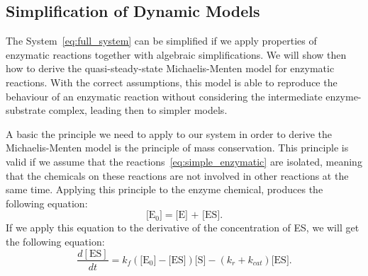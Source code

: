 \subsection{Simplification of Dynamic Models}
The System~\ref{eq:full_system} can be simplified if we
apply properties of enzymatic reactions together with algebraic 
simplifications. We will show then how to derive the quasi-steady-state 
Michaelis-Menten model for enzymatic reactions. With the correct 
assumptions, this model is able to reproduce the behaviour of an 
enzymatic reaction without considering the intermediate enzyme-substrate 
complex, leading then to simpler models.

A basic the principle we need to apply to our system in order to derive
the Michaelis-Menten model is the principle of mass conservation. This 
principle is valid if we assume that the 
reactions~\ref{eq:simple_enzymatic} are isolated, meaning that the 
chemicals on these reactions are not involved in other reactions at the
same time. Applying this principle to the enzyme chemical, produces the
following equation:
\begin{equation*}
    \text{[E$_0$]} = \text{[E] + [ES]}.
    \label{eq:E_conservation}
\end{equation*}
If we apply this equation to the derivative of the concentration of ES,
we will get the following equation:
\begin{equation}
    \frac{d[\text{ES}]}{dt} =  
        k_f(\text{[E$_0$]} - \text{[ES]})\text{[S]} 
        - (k_r + k_{cat}) \text{[ES]}. 
        \label{eq:dESdt_2}
\end{equation}

